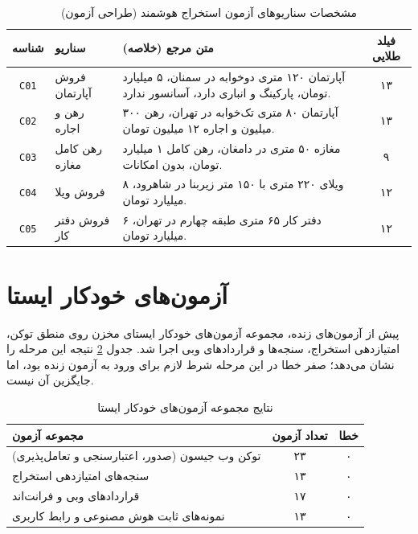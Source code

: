 \documentclass[11pt, a4paper]{report}
\makeatletter
\let\amlak@hline\hline
\newcommand{\code}[1]{\foreignlanguage{english}{\texttt{#1}}}
\let\hline\amlak@hline
\makeatother
\begin{document}
\begin{table}[htbp]
\centering
\caption{مشخصات سناریوهای آزمون استخراج هوشمند (طراحی آزمون)}
\label{tab:scenario_design}
\renewcommand{\arraystretch}{1.5}
\begin{tabular}{|c|p{2.6cm}|p{6.6cm}|c|}
\hline
\textbf{شناسه} & \textbf{سناریو} & \textbf{متن مرجع (خلاصه)} & \textbf{فیلد طلایی} \\ \hline
\code{C01} & فروش آپارتمان & آپارتمان ۱۲۰ متری دوخوابه در سمنان، ۵ میلیارد تومان، پارکینگ و انباری دارد، آسانسور ندارد. & ۱۳ \\ \hline
\code{C02} & رهن و اجاره & آپارتمان ۸۰ متری تک‌خوابه در تهران، رهن ۳۰۰ میلیون و اجاره ۱۲ میلیون تومان. & ۱۳ \\ \hline
\code{C03} & رهن کامل مغازه & مغازه ۵۰ متری در دامغان، رهن کامل ۱ میلیارد تومان، بدون امکانات. & ۹ \\ \hline
\code{C04} & فروش ویلا & ویلای ۲۲۰ متری با ۱۵۰ متر زیربنا در شاهرود، ۸ میلیارد تومان. & ۱۲ \\ \hline
\code{C05} & فروش دفتر کار & دفتر کار ۶۵ متری طبقه چهارم در تهران، ۶ میلیارد تومان. & ۱۲ \\ \hline
\end{tabular}
\end{table}

\section{آزمون‌های خودکار ایستا}
پیش از آزمون‌های زنده، مجموعه آزمون‌های خودکار ایستای مخزن روی منطق توکن، امتیازدهی استخراج، سنجه‌ها و قراردادهای وبی اجرا شد. جدول \ref{tab:auto_tests} نتیجه این مرحله را نشان می‌دهد؛ صفر خطا در این مرحله شرط لازم برای ورود به آزمون زنده بود، اما جایگزین آن نیست.

\begin{table}[htbp]
\centering
\caption{نتایج مجموعه آزمون‌های خودکار ایستا}
\label{tab:auto_tests}
\renewcommand{\arraystretch}{1.5}
\begin{tabular}{|p{6cm}|c|c|}
\hline
\textbf{مجموعه آزمون} & \textbf{تعداد آزمون} & \textbf{خطا} \\ \hline
توکن وب جیسون (صدور، اعتبارسنجی و تعامل‌پذیری) & ۲۳ & ۰ \\ \hline
سنجه‌های امتیازدهی استخراج & ۱۳ & ۰ \\ \hline
قراردادهای وبی و فرانت‌اند & ۱۷ & ۰ \\ \hline
نمونه‌های ثابت هوش مصنوعی و رابط کاربری & ۱۳ & ۰ \\ \hline
\end{tabular}
\end{table}
\end{document}
